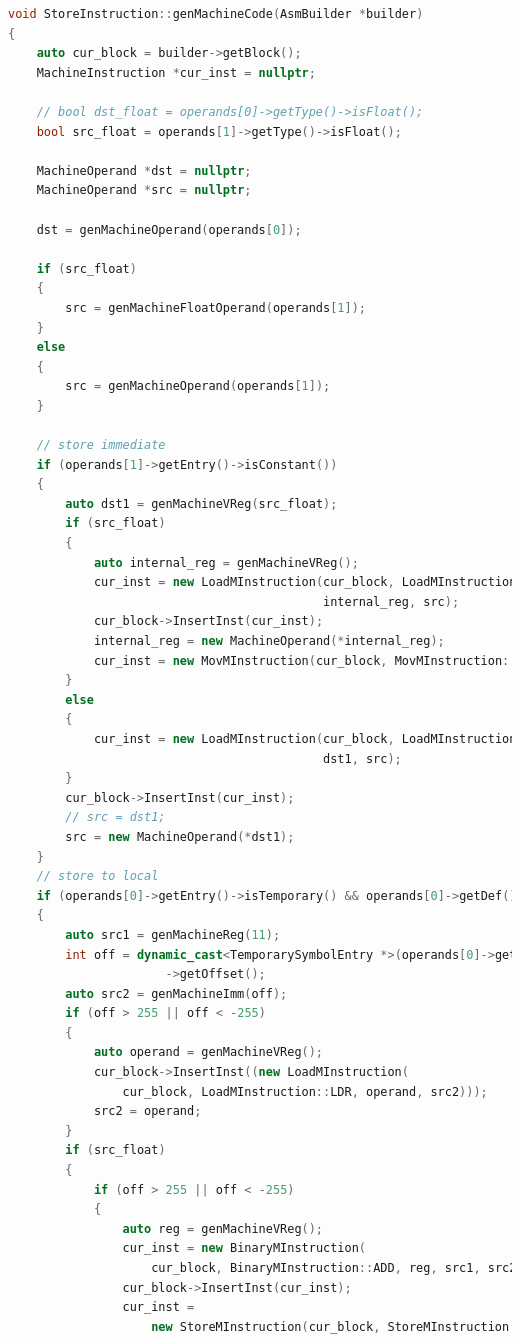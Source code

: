 \documentclass[UTF8,a4paper,10pt]{ctexart}
\begin{document}
\begin{lstlisting}[title = 生成目标代码, language = c++]
void StoreInstruction::genMachineCode(AsmBuilder *builder)
{
    auto cur_block = builder->getBlock();
    MachineInstruction *cur_inst = nullptr;

    // bool dst_float = operands[0]->getType()->isFloat();
    bool src_float = operands[1]->getType()->isFloat();

    MachineOperand *dst = nullptr;
    MachineOperand *src = nullptr;

    dst = genMachineOperand(operands[0]);

    if (src_float)
    {
        src = genMachineFloatOperand(operands[1]);
    }
    else
    {
        src = genMachineOperand(operands[1]);
    }

    // store immediate
    if (operands[1]->getEntry()->isConstant())
    {
        auto dst1 = genMachineVReg(src_float);
        if (src_float)
        {
            auto internal_reg = genMachineVReg();
            cur_inst = new LoadMInstruction(cur_block, LoadMInstruction::LDR,
                                            internal_reg, src);
            cur_block->InsertInst(cur_inst);
            internal_reg = new MachineOperand(*internal_reg);
            cur_inst = new MovMInstruction(cur_block, MovMInstruction::VMOV, dst1, internal_reg);
        }
        else
        {
            cur_inst = new LoadMInstruction(cur_block, LoadMInstruction::LDR,
                                            dst1, src);
        }
        cur_block->InsertInst(cur_inst);
        // src = dst1;
        src = new MachineOperand(*dst1);
    }
    // store to local
    if (operands[0]->getEntry()->isTemporary() && operands[0]->getDef() && operands[0]->getDef()->isAlloc())
    {
        auto src1 = genMachineReg(11);
        int off = dynamic_cast<TemporarySymbolEntry *>(operands[0]->getEntry())
                      ->getOffset();
        auto src2 = genMachineImm(off);
        if (off > 255 || off < -255)
        {
            auto operand = genMachineVReg();
            cur_block->InsertInst((new LoadMInstruction(
                cur_block, LoadMInstruction::LDR, operand, src2)));
            src2 = operand;
        }
        if (src_float)
        {
            if (off > 255 || off < -255)
            {
                auto reg = genMachineVReg();
                cur_inst = new BinaryMInstruction(
                    cur_block, BinaryMInstruction::ADD, reg, src1, src2);
                cur_block->InsertInst(cur_inst);
                cur_inst =
                    new StoreMInstruction(cur_block, StoreMInstruction::VSTR,

\end{lstlisting}
\end{document}
